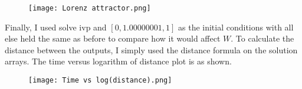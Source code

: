 \documentclass{article}
\begin{document}
\begin{figure}[htp]
\centering
\graphicspath{ {./} }
\texttt{[image: Lorenz attractor.png]}
\end{figure}

Finally, I used solve ivp and $[0, 1.00000001, 1]$ as the initial conditions with all else held the same as before to compare how it would affect $W$. To calculate the distance between the outputs, I simply used the distance formula on the solution arrays. The time versus logarithm of distance plot is as shown.

\begin{figure}[htp]
\graphicspath{ {./} }
\centering
\texttt{[image: Time vs log(distance).png]}
\end{figure}
\end{document}
